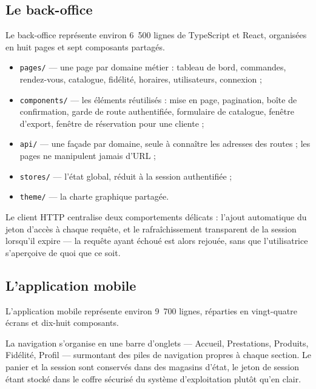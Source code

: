 \subsection{Le back-office}

Le back-office représente environ 6~500 lignes de TypeScript et React,
organisées en huit pages et sept composants partagés.


\begin{itemize}[leftmargin=1.2cm]
  \item \texttt{pages/} --- une page par domaine métier : tableau de bord,
  commandes, rendez-vous, catalogue, fidélité, horaires, utilisateurs,
  connexion ;
  \item \texttt{components/} --- les éléments réutilisés : mise en page,
  pagination, boîte de confirmation, garde de route authentifiée, formulaire de
  catalogue, fenêtre d'export, fenêtre de réservation pour une cliente ;
  \item \texttt{api/} --- une façade par domaine, seule à connaître les
  adresses des routes ; les pages ne manipulent jamais d'URL ;
  \item \texttt{stores/} --- l'état global, réduit à la session authentifiée ;
  \item \texttt{theme/} --- la charte graphique partagée.
\end{itemize}

Le client HTTP centralise deux comportements délicats : l'ajout automatique du
jeton d'accès à chaque requête, et le rafraîchissement transparent de la
session lorsqu'il expire --- la requête ayant échoué est alors rejouée, sans
que l'utilisatrice s'aperçoive de quoi que ce soit.

\subsection{L'application mobile}

L'application mobile représente environ 9~700 lignes, réparties en vingt-quatre
écrans et dix-huit composants.


La navigation s'organise en une barre d'onglets --- Accueil, Prestations,
Produits, Fidélité, Profil --- surmontant des piles de navigation propres à
chaque section. Le panier et la session sont conservés dans des magasins
d'état, le jeton de session étant stocké dans le coffre sécurisé du système
d'exploitation plutôt qu'en clair.

